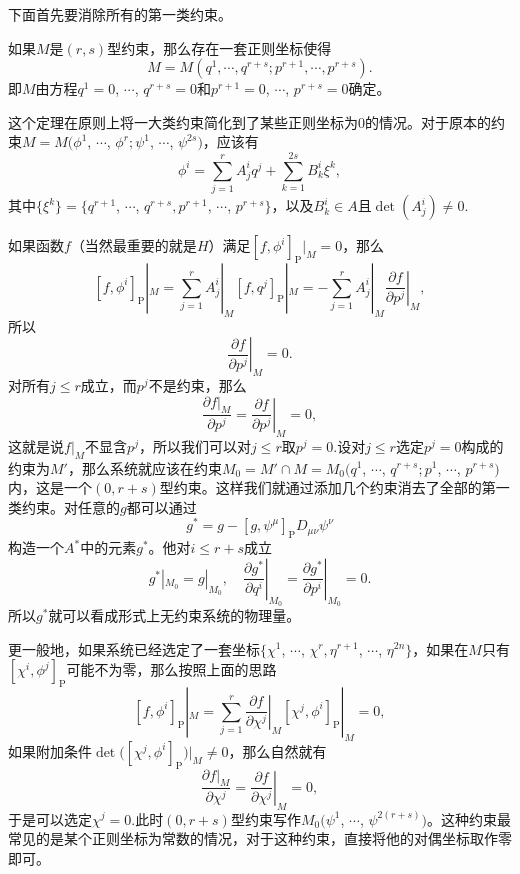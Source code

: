 下面首先要消除所有的第一类约束。
\begin{theo}
	如果$M$是$(r,s)$型约束，那么存在一套正则坐标使得
	\[
		M=M(q^1,\cdots,q^{r+s};p^{r+1},\cdots,p^{r+s}).
	\]
	即$M$由方程$q^1=0$, $\cdots$, $q^{r+s}=0$和$p^{r+1}=0$, $\cdots$, $p^{r+s}=0$确定。
\end{theo}
这个定理在原则上将一大类约束简化到了某些正则坐标为0的情况。对于原本的约束$M=M(\phi^1$, $\cdots$, $\phi^{r};\psi^{1}$, $\cdots$, $\psi^{2s})$，应该有
\[
	\phi^i=\sum_{j=1}^rA^i_jq^j+\sum_{k=1}^{2s}B^i_k\xi^k,
\]
其中$\{\xi^k\}=\{q^{r+1}$, $\cdots$, $q^{r+s},p^{r+1}$, $\cdots$, $p^{r+s}\}$，以及$B^i_k\in A$且$\det(A^i_j)\neq 0$.

如果函数$f$（当然最重要的就是$H$）满足$[f,\phi^i]_{\mathrm{P}}|_M=0$，那么
\[
	[f,\phi^i]_{\mathrm{P}}|_M=\sum_{j=1}^rA^i_j|_M[f,q^j]_{\mathrm{P}}|_M=-\sum_{j=1}^rA^i_j|_M\left.\frac{\partial f}{\partial p^j}\right|_M,
\]
所以
\[
	\left.\frac{\partial f}{\partial p^j}\right|_M=0.
\]
对所有$j\leq r$成立，而$p^j$不是约束，那么
\[
	\frac{\partial f|_M}{\partial p^j}=\left.\frac{\partial f}{\partial p^j}\right|_M=0,
\]
这就是说$f|_M$不显含$p^j$，所以我们可以对$j\leq r$取$p^j=0$.设对$j\leq r$选定$p^j=0$构成的约束为$M'$，那么系统就应该在约束$M_0=M'\cap M=M_0(q^1$, $\cdots$, $q^{r+s};p^1$, $\cdots$, $p^{r+s})$内，这是一个$(0,r+s)$型约束。这样我们就通过添加几个约束消去了全部的第一类约束。对任意的$g$都可以通过
\[
	g^*=g-[g,\psi^\mu]_{\mathrm{P}}D_{\mu\nu}\psi^\nu
\]
构造一个$A^*$中的元素$g^*$。他对$i\leq r+s$成立
\begin{equation}
	g^*|_{M_0}=g|_{M_0},\quad \left.\frac{\partial g^*}{\partial q^i}\right|_{M_0}=\left.\frac{\partial g^*}{\partial p^i}\right|_{M_0}=0.
	\label{s2:3}
\end{equation}
所以$g^*$就可以看成形式上无约束系统的物理量。

更一般地，如果系统已经选定了一套坐标$\{\chi^1$, $\cdots$, $\chi^r,\eta^{r+1}$, $\cdots$, $\eta^{2n}\}$，如果在$M$只有$[\chi^i,\phi^j]_{\mathrm{P}}$可能不为零，那么按照上面的思路
\[
	[f,\phi^i]_{\mathrm{P}}|_M=\sum_{j=1}^r\left.\frac{\partial f}{\partial \chi^j}\right|_M[\chi^j,\phi^i]_{\mathrm{P}}|_M=0,
\]
如果附加条件$\det\bigl([\chi^j,\phi^i]_{\mathrm{P}}\bigr)|_M\neq 0$，那么自然就有
\[
	\frac{\partial f|_M}{\partial \chi^j}=\left.\frac{\partial f}{\partial \chi^j}\right|_M=0,
\]
于是可以选定$\chi^j=0$.此时$(0,r+s)$型约束写作$M_0\bigl(\psi^{1}$, $\cdots$, $\psi^{2(r+s)}\bigr)$。这种约束最常见的是某个正则坐标为常数的情况，对于这种约束，直接将他的对偶坐标取作零即可。

